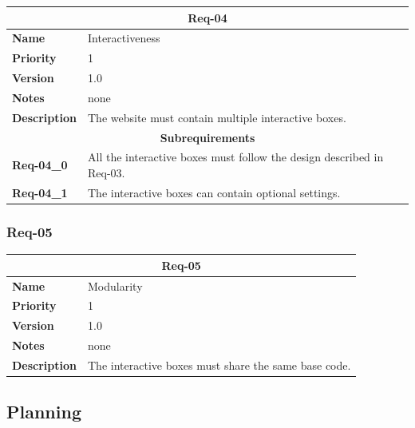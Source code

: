 \documentclass{article}
\begin{document}
\bgroup{}
\def\arraystretch{1.25}
\begin{center}
    \begin{tabular}{ |l|p{9cm}| }
        \hline
        \multicolumn{2}{|c|}{\textbf{Req-04}} \\
        \hline
        \textbf{Name} & Interactiveness \\
        \hline
        \textbf{Priority} & 1 \\
        \hline
        \textbf{Version} & 1.0 \\
        \hline
        \textbf{Notes} & none \\
        \hline
        \textbf{Description}
        & The website must contain multiple interactive boxes. \\
        \hline
        \multicolumn{2}{|c|}{\textbf{Subrequirements}} \\
        \hline
        \textbf{Req-04\_0} & All the interactive boxes must follow the design described in Req-03. \\
        \hline
        \textbf{Req-04\_1} & The interactive boxes can contain optional settings.\\
        \hline
    \end{tabular}
\end{center}
\egroup{}

\subsubsection{Req-05}

\bgroup{}
\def\arraystretch{1.25}
\begin{center}
    \begin{tabular}{ |l|p{9cm}| }
        \hline
        \multicolumn{2}{|c|}{\textbf{Req-05}} \\
        \hline
        \textbf{Name} & Modularity \\
        \hline
        \textbf{Priority} & 1 \\
        \hline
        \textbf{Version} & 1.0 \\
        \hline
        \textbf{Notes} & none \\
        \hline
        \textbf{Description}
        & The interactive boxes must share the same base code. \\
        \hline
    \end{tabular}
\end{center}
\egroup{}

\pagebreak

\subsection{Planning}
\end{document}
